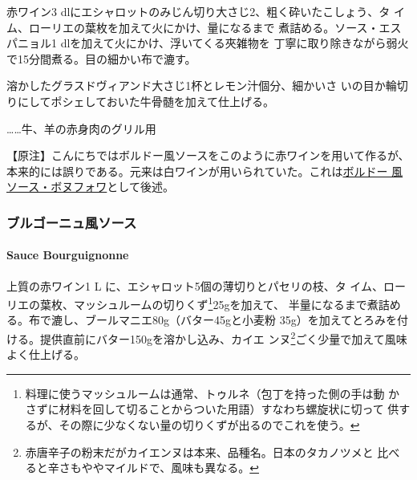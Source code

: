 \begin{recette}
赤ワイン3 dlにエシャロットのみじん切り大さじ2、粗く砕いたこしょう、タ
イム、ローリエの葉\undemi{}枚を加えて火にかけ、\unquart{}量になるまで
煮詰める。ソース・エスパニョル1 dlを加えて火にかけ、浮いてくる夾雑物を
丁寧に取り除きながら弱火で15分間煮る。目の細かい布で漉す。

溶かしたグラスドヴィアンド大さじ1杯とレモン汁\unquart{}個分、細かいさ
いの目か輪切りにしてポシェしておいた牛骨髄を加えて仕上げる。

\ldots{}\ldots{}牛、羊の赤身肉のグリル用

【原注】こんにちではボルドー風ソースをこのように赤ワインを用いて作るが、
本来的には誤りである。元来は白ワインが用いられていた。これは\protect\hyperlink{sauce-bonnefoy}{ボルドー
風ソース・ボヌフォワ}として後述。

\maeaki

\hypertarget{ux30d6ux30ebux30b4ux30fcux30cbux30e5ux98a8ux30bdux30fcux30b9}{%
\subsubsection{ブルゴーニュ風ソース}\label{ux30d6ux30ebux30b4ux30fcux30cbux30e5ux98a8ux30bdux30fcux30b9}}

\hypertarget{sauce-bourguignonne}{%
\paragraph{Sauce Bourguignonne}\label{sauce-bourguignonne}}


上質の赤ワイン1\undemi{} L に、エシャロット5個の薄切りとパセリの枝、タ
イム、ローリエの葉\undemi{}枚、マッシュルームの切りくず\footnote{料理に使うマッシュルームは通常、トゥルネ（包丁を持った側の手は動
  かさずに材料を回して切ることからついた用語）すなわち螺旋状に切って
  供するが、その際に少なくない量の切りくずが出るのでこれを使う。}25gを加えて、
半量になるまで煮詰める。布で漉し、ブールマニエ80g（バター45gと小麦粉
35g）を加えてとろみを付ける。提供直前にバター150gを溶かし込み、カイエ
ンヌ\footnote{赤唐辛子の粉末だがカイエンヌは本来、品種名。日本のタカノツメと
  比べると辛さもややマイルドで、風味も異なる。}ごく少量で加えて風味よく仕上げる。


\end{recette}
